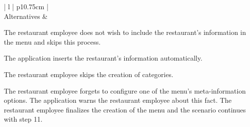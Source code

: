 \begin{center}
\begin{tabular}{| l | p{10.75cm} | }
    \\
    \hline
    Alternatives &
    \begin{minipage}[t]{\linewidth}
      \begin{description}[nosep,after=\strut]
        \item [A1:] The restaurant employee does not wish to include the restaurant's information in the menu and skips this process. 
        \item [A2:] The application inserts the restaurant's information automatically.
        \item [A3:] The restaurant employee skips the creation of categories.
        \item [A4:] The restaurant employee forgets to configure one of the menu's meta-information options. The application warns the restaurant employee about this fact. The restaurant employee finalizes the creation of the menu and the scenario continues with step 11.
      \end{description}
    \end{minipage}
    \\
    \hline
  \end{tabular}
  \newline
\end{center}

